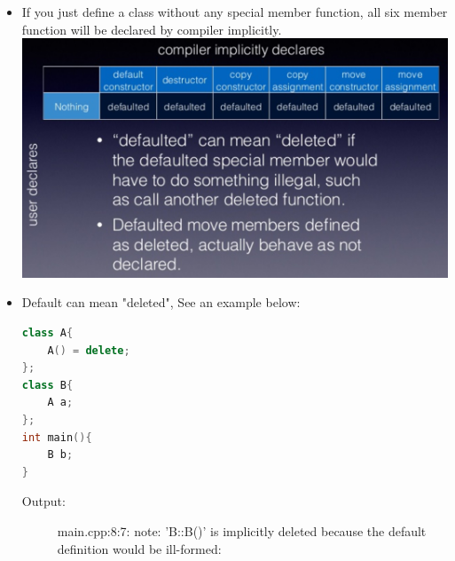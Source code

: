 \documentclass[a4paper,11pt,twoside]{book}
\begin{document}
\begin{itemize}
\item If you just define a class without any special member function, all six member function will be declared by compiler implicitly. \\
\includegraphics[scale=0.5]{pics/sm2.png} \newline


\item Default can mean "deleted", See an example below:

\begin{lstlisting}[frame=single, language=c++]
class A{
	A() = delete;
};
class B{
	A a;
};
int main(){
	B b;
}
\end{lstlisting}
\begin{description}
	\item[Output:] main.cpp:8:7: note: 'B::B()' is implicitly deleted because the default definition would be ill-formed:
\end{description}



\end{itemize}
\end{document}
